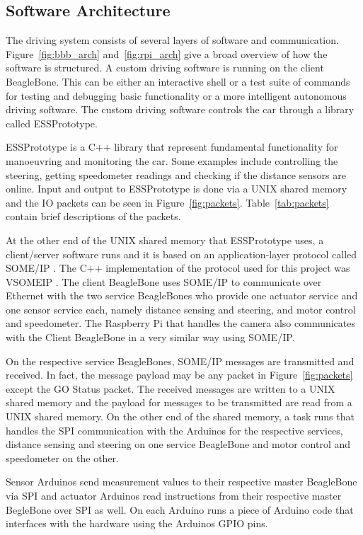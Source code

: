 \documentclass[11pt, titlepage]{article} %
\begin{document}
\subsection{Software Architecture}
The driving system consists of several layers of software and communication.
Figure~\ref{fig:bbb_arch} and~\ref{fig:rpi_arch} give a broad overview
of how the software is structured. A custom driving software is running on the
client BeagleBone. This can be either an interactive shell or a test suite of commands
for testing and debugging basic functionality or a more intelligent autonomous
driving software. The custom driving software controls the car through a library
called ESSPrototype.

ESSPrototype is a C++ library that represent fundamental functionality for manoeuvring and monitoring
the car. Some examples include controlling the steering, getting speedometer readings and checking if the distance sensors are online.
Input and output to ESSPrototype is done via a UNIX shared memory and the IO packets can be seen in Figure~\ref{fig:packets}. Table~\ref{tab:packets}
contain brief descriptions of the packets.

At the other end of the UNIX shared memory that ESSPrototype uses, a client/server software
runs and it is based on an application-layer protocol called SOME/IP \cite{someip}. The C++ implementation of the 
protocol used for this project was VSOMEIP \cite{vsomeip}. The client BeagleBone uses SOME/IP to communicate over
Ethernet with the two service BeagleBones who provide one actuator service and one sensor service each, namely
distance sensing and steering, and motor control and speedometer. The Raspberry Pi that handles the camera
also communicates with the Client BeagleBone in a very similar way using SOME/IP.

On the respective service BeagleBones, SOME/IP messages are transmitted and received. In fact, the message
payload may be any packet in Figure~\ref{fig:packets} except the GO Status packet. The received messages
are written to a UNIX shared memory and the payload for messages to be transmitted are read from a UNIX
shared memory. On the other end of the shared memory, a task runs that handles the SPI communication
with the Arduinos for the respective services, distance sensing and steering on one service BeagleBone and
motor control and speedometer on the other.

Sensor Arduinos send measurement values to their respective master BeagleBone via SPI and actuator Arduinos
read instructions from their respective master BegleBone over SPI as well. On each Arduino runs a piece
of Arduino code that interfaces with the hardware using the Arduinos GPIO pins.
\end{document}
